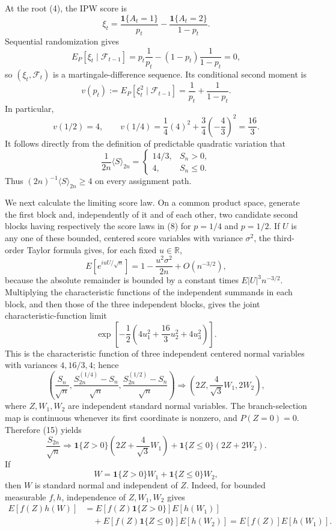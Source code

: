 At the root (4), the IPW score is
\[
\xi_t=
\frac{\mathbf1\{A_t=1\}}{p_t}
-\frac{\mathbf1\{A_t=2\}}{1-p_t}.
\tag{8}
\]
Sequential randomization gives
\[
E_P[\xi_t\mid\mathcal F_{t-1}]
=p_t\frac1{p_t}-(1-p_t)\frac1{1-p_t}=0,
\tag{9}
\]
so \((\xi_t,\mathcal F_t)\) is a martingale-difference sequence. Its conditional second moment is
\[
v(p_t):=E_P[\xi_t^2\mid\mathcal F_{t-1}]
=\frac1{p_t}+\frac1{1-p_t}.
\tag{10}
\]
In particular,
\[
v(1/2)=4,
\qquad
v(1/4)=\frac14(4)^2+\frac34\left(-\frac43\right)^2=\frac{16}{3}.
\tag{11}
\]
It follows directly from the definition of predictable quadratic variation that
\[
\frac1{2n}\langle S\rangle_{2n}
=
\begin{cases}
14/3,&S_n>0,\\
4,&S_n\le0.
\end{cases}
\tag{12}
\]
Thus \((2n)^{-1}\langle S\rangle_{2n}\ge4\) on every assignment path.

We next calculate the limiting score law. On a common product space, generate the first block and, independently of it and of each other, two candidate second blocks having respectively the score laws in (8) for \(p=1/4\) and \(p=1/2\). If \(U\) is any one of these bounded, centered score variables with variance \(\sigma^2\), the third-order Taylor formula gives, for each fixed \(u\in\mathbb R\),
\[
E\left[e^{iuU/\sqrt n}\right]
=1-\frac{u^2\sigma^2}{2n}+O(n^{-3/2}),
\tag{13}
\]
because the absolute remainder is bounded by a constant times \(E|U|^3n^{-3/2}\). Multiplying the characteristic functions of the independent summands in each block, and then those of the three independent blocks, gives the joint characteristic-function limit
\[
\exp\left[-\frac12\left(4u_1^2+\frac{16}{3}u_2^2+4u_3^2\right)\right].
\tag{14}
\]
This is the characteristic function of three independent centered normal variables with variances \(4,16/3,4\); hence
\[
\left(
\frac{S_n}{\sqrt n},
\frac{S^{(1/4)}_{2n}-S_n}{\sqrt n},
\frac{S^{(1/2)}_{2n}-S_n}{\sqrt n}
\right)
\Longrightarrow
\left(2Z,\frac4{\sqrt3}W_1,2W_2\right),
\tag{15}
\]
where \(Z,W_1,W_2\) are independent standard normal variables. The branch-selection map is continuous whenever its first coordinate is nonzero, and \(P(Z=0)=0\). Therefore (15) yields
\[
\frac{S_{2n}}{\sqrt n}
\Longrightarrow
\mathbf1\{Z>0\}\left(2Z+\frac4{\sqrt3}W_1\right)
+\mathbf1\{Z\le0\}(2Z+2W_2).
\tag{16}
\]
If
\[
W=\mathbf1\{Z>0\}W_1+\mathbf1\{Z\le0\}W_2,
\]
then \(W\) is standard normal and independent of \(Z\). Indeed, for bounded measurable \(f,h\), independence of \(Z,W_1,W_2\) gives
\[
\begin{aligned}
E[f(Z)h(W)]
&=E[f(Z)\mathbf1\{Z>0\}]E[h(W_1)]\\
&\quad+E[f(Z)\mathbf1\{Z\le0\}]E[h(W_2)]
=E[f(Z)]E[h(W_1)].
\end{aligned}
\tag{17}
\]

